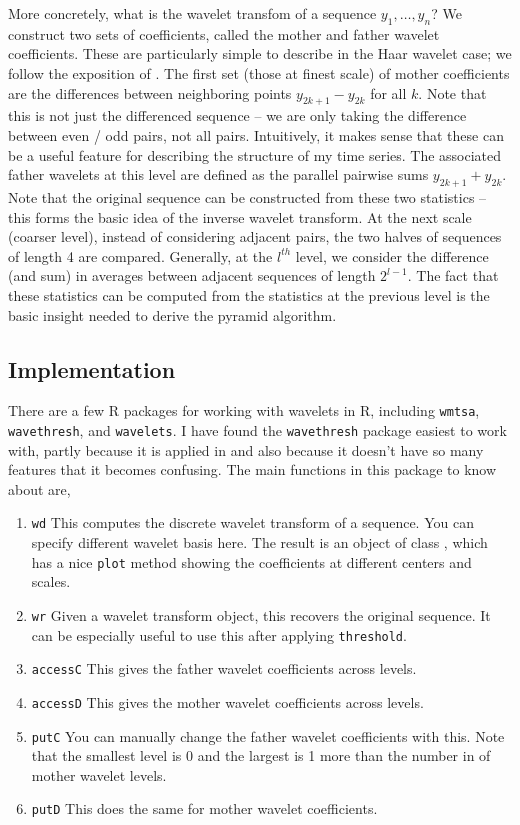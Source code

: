 \documentclass{article}
\begin{document}
More concretely, what is the wavelet transfom of a sequence $y_{1}, \dots,
y_{n}$? We construct two sets of coefficients, called the mother and father
wavelet coefficients. These are particularly simple to describe in the Haar
wavelet case; we follow the exposition of \citep{nason2011wavelet}. The first
set (those at finest scale) of mother coefficients are the differences between
neighboring points $y_{2k +1} - y_{2k}$ for all $k$. Note that this is not just
the differenced sequence -- we are only taking the difference between even / odd
pairs, not all pairs. Intuitively, it makes sense that these can be a useful
feature for describing the structure of my time series. The associated father
wavelets at this level are defined as the parallel pairwise sums $y_{2k + 1} +
y_{2k}$. Note that the original sequence can be constructed from these two
statistics -- this forms the basic idea of the inverse wavelet transform. At the
next scale (coarser level), instead of considering adjacent pairs, the two
halves of sequences of length 4 are compared. Generally, at the $l^{th}$ level,
we consider the difference (and sum) in averages between adjacent sequences of
length $2^{l - 1}$. The fact that these statistics can be computed from the
statistics at the previous level is the basic insight needed to derive the
pyramid algorithm.

\subsection{Implementation}

There are a few R packages for working with wavelets in R, including
\texttt{wmtsa}, \texttt{wavethresh}, and \texttt{wavelets}. I have found the
\texttt{wavethresh} package easiest to work with, partly because it is applied
in \citep{nason2011wavelet} and also because it doesn't have so many features
that it becomes confusing. The main functions in this package to know about are,

\begin{enumerate}
  \item \texttt{wd} This computes the discrete wavelet transform of a sequence.
    You can specify different wavelet basis here. The result is an object of class
    , which has a nice \texttt{plot} method showing the
    coefficients at different centers and scales.
  \item \texttt{wr} Given a wavelet transform object, this recovers the original
    sequence. It can be especially useful to use this after applying \texttt{threshold}.
  \item \texttt{accessC} This gives the father wavelet coefficients across levels.
  \item \texttt{accessD} This gives the mother wavelet coefficients across levels.
  \item \texttt{putC} You can manually change the father wavelet coefficients
    with this. Note that the smallest level is 0 and the largest is 1 more than
    the number in of mother wavelet levels.
  \item \texttt{putD} This does the same for mother wavelet coefficients.
\end{enumerate}
\end{document}
